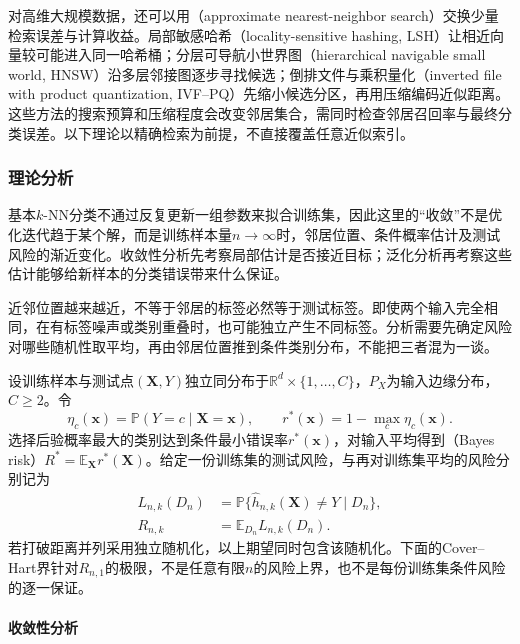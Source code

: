 对高维大规模数据，还可以用（approximate nearest-neighbor search）交换少量检索误差与计算收益。局部敏感哈希（locality-sensitive hashing, LSH）让相近向量较可能进入同一哈希桶；分层可导航小世界图（hierarchical navigable small world, HNSW）沿多层邻接图逐步寻找候选；倒排文件与乘积量化（inverted file with product quantization, IVF--PQ）先缩小候选分区，再用压缩编码近似距离。这些方法的搜索预算和压缩程度会改变邻居集合，需同时检查邻居召回率与最终分类误差。以下理论以精确检索为前提，不直接覆盖任意近似索引。

\subsubsection{理论分析}
\label{sec:classification-knn-theory}

基本$k$-NN分类不通过反复更新一组参数来拟合训练集，因此这里的“收敛”不是优化迭代趋于某个解，而是训练样本量$n\to\infty$时，邻居位置、条件概率估计及测试风险的渐近变化。收敛性分析先考察局部估计是否接近目标；泛化分析再考察这些估计能够给新样本的分类错误带来什么保证。

近邻位置越来越近，不等于邻居的标签必然等于测试标签。即使两个输入完全相同，在有标签噪声或类别重叠时，也可能独立产生不同标签。分析需要先确定风险对哪些随机性取平均，再由邻居位置推到条件类别分布，不能把三者混为一谈。

设训练样本与测试点$(\bm{X},Y)$独立同分布于$\mathbb{R}^d\times\{1,\ldots,C\}$，$P_X$为输入边缘分布，$C\geq2$。令
\begin{equation}
  \eta_c(\bm{x})=\mathbb{P}(Y=c\mid\bm{X}=\bm{x}),
  \qquad
  r^\ast(\bm{x})=1-\max_c\eta_c(\bm{x}).
  \label{eq:classification-local-bayes-risk}
\end{equation}
选择后验概率最大的类别达到条件最小错误率$r^\ast(\bm{x})$，对输入平均得到（Bayes risk）$R^\ast=\mathbb{E}_{\bm{X}}r^\ast(\bm{X})$。给定一份训练集的测试风险，与再对训练集平均的风险分别记为
\begin{align}
  L_{n,k}(D_n)
  &=\mathbb{P}\{\hat h_{n,k}(\bm{X})\neq Y\mid D_n\},
  \label{eq:classification-knn-conditional-risk}\\
  R_{n,k}&=\mathbb{E}_{D_n}L_{n,k}(D_n).
  \label{eq:classification-knn-expected-risk}
\end{align}
若打破距离并列采用独立随机化，以上期望同时包含该随机化。下面的Cover--Hart界针对$R_{n,1}$的极限，不是任意有限$n$的风险上界，也不是每份训练集条件风险的逐一保证。

\paragraph{收敛性分析}

